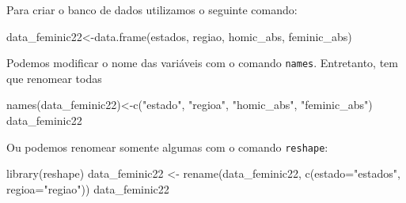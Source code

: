 \documentclass[
  letterpaper,
  DIV=11,
  numbers=noendperiod]{scrreprt}
\newenvironment{Shaded}{\begin{snugshade}}{\end{snugshade}}
\newcommand{\AttributeTok}[1]{\textcolor[rgb]{0.40,0.45,0.13}{#1}}
\newcommand{\FunctionTok}[1]{\textcolor[rgb]{0.28,0.35,0.67}{#1}}
\newcommand{\NormalTok}[1]{\textcolor[rgb]{0.00,0.23,0.31}{#1}}
\newcommand{\OtherTok}[1]{\textcolor[rgb]{0.00,0.23,0.31}{#1}}
\newcommand{\StringTok}[1]{\textcolor[rgb]{0.13,0.47,0.30}{#1}}
\begin{document}
Para criar o banco de dados utilizamos o seguinte comando:

\begin{Shaded}
\begin{Highlighting}[]
\NormalTok{data\_feminic22}\OtherTok{\textless{}{-}}\FunctionTok{data.frame}\NormalTok{(estados, regiao, homic\_abs, feminic\_abs)  }
\end{Highlighting}
\end{Shaded}

Podemos modificar o nome das variáveis com o comando \texttt{names}.
Entretanto, tem que renomear todas

\begin{Shaded}
\begin{Highlighting}[]
\FunctionTok{names}\NormalTok{(data\_feminic22)}\OtherTok{\textless{}{-}}\FunctionTok{c}\NormalTok{(}\StringTok{"estado"}\NormalTok{, }\StringTok{"regioa"}\NormalTok{, }\StringTok{"homic\_abs"}\NormalTok{, }\StringTok{"feminic\_abs"}\NormalTok{) }
\NormalTok{data\_feminic22}
\end{Highlighting}
\end{Shaded}

Ou podemos renomear somente algumas com o comando \texttt{reshape}:

\begin{Shaded}
\begin{Highlighting}[]
\FunctionTok{library}\NormalTok{(reshape)}
\NormalTok{data\_feminic22 }\OtherTok{\textless{}{-}} \FunctionTok{rename}\NormalTok{(data\_feminic22, }\FunctionTok{c}\NormalTok{(}\AttributeTok{estado=}\StringTok{"estados"}\NormalTok{, }\AttributeTok{regioa=}\StringTok{"regiao"}\NormalTok{))}
\NormalTok{data\_feminic22}
\end{Highlighting}
\end{Shaded}
\end{document}
